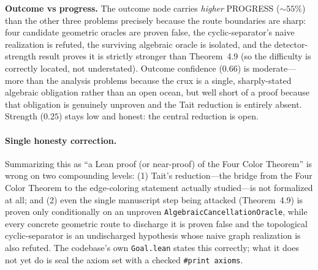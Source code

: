 \noindent\textbf{Outcome vs progress.} The outcome node carries \emph{higher}
PROGRESS ($\sim 55\%$) than the other three problems precisely because the route
boundaries are sharp: four candidate geometric oracles are proven false, the
cyclic-separator's naive realization is refuted, the surviving algebraic oracle is
isolated, and the detector-strength result proves it is strictly stronger than
Theorem~4.9 (so the difficulty is correctly located, not understated). Outcome
confidence ($0.66$) is moderate---more than the analysis problems because the
crux is a single, sharply-stated algebraic obligation rather than an open ocean,
but well short of a proof because that obligation is genuinely unproven and the
Tait reduction is entirely absent. Strength ($0.25$) stays low and honest: the
central reduction is open.

\paragraph{Single honesty correction.}
Summarizing this as ``a Lean proof (or near-proof) of the Four Color Theorem''
is wrong on two compounding levels: (1) Tait's reduction---the bridge from the
Four Color Theorem to the edge-coloring statement actually studied---is not
formalized at all; and (2) even the single manuscript step being attacked
(Theorem~4.9) is proven only conditionally on an unproven
\texttt{AlgebraicCancellationOracle}, while every concrete geometric route to
discharge it is proven false and the topological cyclic-separator is an
undischarged hypothesis whose naive graph realization is also refuted. The
codebase's own \texttt{Goal.lean} states this correctly; what it does not yet do
is seal the axiom set with a checked \texttt{\#print axioms}.
